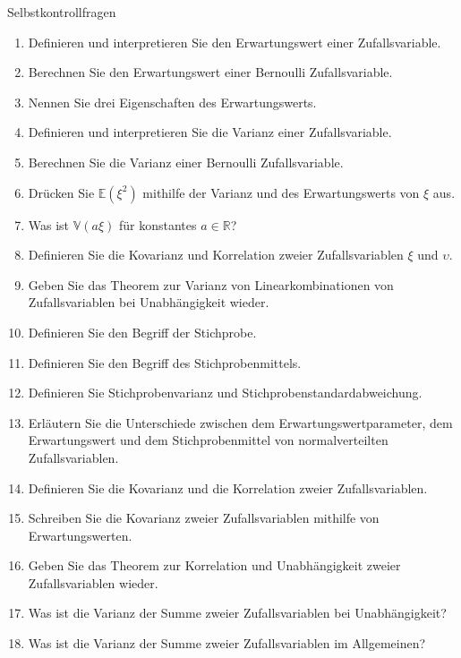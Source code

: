 \documentclass[
  8pt,
  ignorenonframetext,
]{beamer}
\providecommand{\tightlist}{%
  \setlength{\itemsep}{0pt}\setlength{\parskip}{0pt}}
\newcommand{\ups}{\upsilon}
\begin{document}
\begin{frame}{Selbstkontrollfragen}
\protect\hypertarget{selbstkontrollfragen}{}
\footnotesize
{}

\begin{enumerate}
\tightlist
\item
  Definieren und interpretieren Sie den Erwartungswert einer
  Zufallsvariable.
\item
  Berechnen Sie den Erwartungswert einer Bernoulli Zufallsvariable.
\item
  Nennen Sie drei Eigenschaften des Erwartungswerts.
\item
  Definieren und interpretieren Sie die Varianz einer Zufallsvariable.
\item
  Berechnen Sie die Varianz einer Bernoulli Zufallsvariable.
\item
  Drücken Sie \(\mathbb{E}(\xi^2)\) mithilfe der Varianz und des
  Erwartungswerts von \(\xi\) aus.
\item
  Was ist \(\mathbb{V}(a\xi)\) für konstantes \(a \in \mathbb{R}\)?
\item
  Definieren Sie die Kovarianz und Korrelation zweier Zufallsvariablen
  \(\xi\) und \(\ups\).
\item
  Geben Sie das Theorem zur Varianz von Linearkombinationen von
  Zufallsvariablen bei Unabhängigkeit wieder.
\item
  Definieren Sie den Begriff der Stichprobe.
\item
  Definieren Sie den Begriff des Stichprobenmittels.
\item
  Definieren Sie Stichprobenvarianz und Stichprobenstandardabweichung.
\item
  Erläutern Sie die Unterschiede zwischen dem Erwartungswertparameter,
  dem Erwartungswert und dem Stichprobenmittel von normalverteilten
  Zufallsvariablen.
\item
  Definieren Sie die Kovarianz und die Korrelation zweier
  Zufallsvariablen.
\item
  Schreiben Sie die Kovarianz zweier Zufallsvariablen mithilfe von
  Erwartungswerten.
\item
  Geben Sie das Theorem zur Korrelation und Unabhängigkeit zweier
  Zufallsvariablen wieder.
\item
  Was ist die Varianz der Summe zweier Zufallsvariablen bei
  Unabhängigkeit?
\item
  Was ist die Varianz der Summe zweier Zufallsvariablen im Allgemeinen?
\end{enumerate}
\end{frame}
\end{document}
